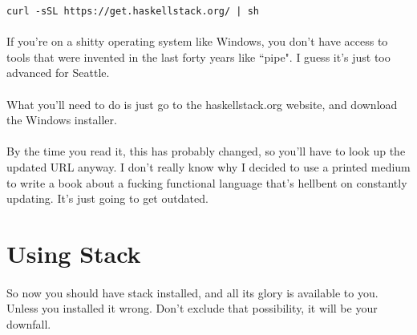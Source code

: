\begin{verbatim}
curl -sSL https://get.haskellstack.org/ | sh
\end{verbatim}

\paragraph{}
If you're on a shitty operating system like Windows, you don't have access to tools that were invented in the last forty years like ``pipe".  I guess it's just too advanced for Seattle. 

\paragraph{}
What you'll need to do is just go to the haskellstack.org website, and download the Windows installer. 

\paragraph{}
By the time you read it, this has probably changed, so you'll have to look up the updated URL anyway.  I don't really know why I decided to use a printed medium to write a book about a fucking functional language that's hellbent on constantly updating. It's just going to get outdated.

\section{Using Stack}
\paragraph{}
So now you should have stack installed, and all its glory is available to you.  Unless you installed it wrong.  Don't exclude that possibility, it will be your downfall.  


\paragraph{}


